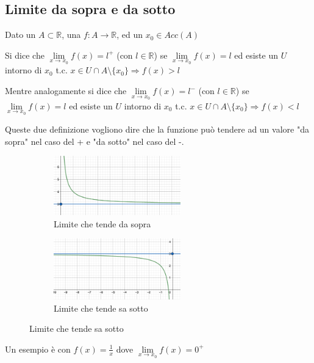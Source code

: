 \subsection{Limite da sopra e da sotto}
Dato un $A \subset \mathbb{R}$, una $f: A \to \mathbb{R}$, ed un $x_0 \in Acc(A)$
\begin{definition}
 Si dice che $\lim\limits_{x \to x_0}f(x) = l^+$ (con $l \in \mathbb{R}$) se $\lim\limits_{x\to x_0}f(x) = l$ ed esiste un $U$ intorno di $x_0$ t.c. $x \in U \cap A \setminus \{x_0\} \Longrightarrow f(x) > l$
\end{definition}
\begin{definition}
 Mentre analogamente si dice che $\lim\limits_{x \to x_0}f(x) = l^-$ (con $l \in \mathbb{R}$) se $\lim\limits_{x\to x_0}f(x) = l$ ed esiste un $U$ intorno di $x_0$ t.c. $x \in U \cap A \setminus \{x_0\} \Longrightarrow f(x) < l$
\end{definition}
Queste due definizione vogliono dire che la funzione può tendere ad un valore "da sopra" nel caso del + e "da sotto" nel caso del -.
\begin{figure}[h!]
    \begin{subfigure}{.5\textwidth}
        \centering
        \includegraphics[width=5.5cm]{images/limite-tende-sopra.png}
        \caption{Limite che tende da sopra}
    \end{subfigure}
    \begin{subfigure}{.5\textwidth}
        \centering
        \includegraphics[width=5.5cm]{images/lim-tende-sotto.png}
        \caption{Limite che tende sa sotto}
    \end{subfigure}
\end{figure}
\begin{example}
Un esempio è con $f(x) = \frac{1}{x}$ dove $\lim\limits_{x\to x_0}f(x) = 0^+$
\end{example}

